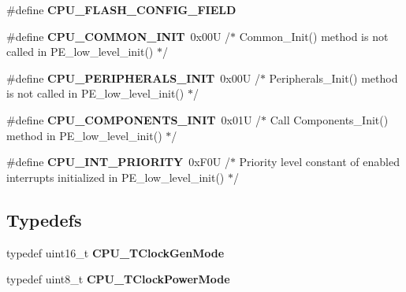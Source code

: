 \begin{DoxyCompactItemize}
\item 
\#define {\bfseries C\+P\+U\+\_\+\+F\+L\+A\+S\+H\+\_\+\+C\+O\+N\+F\+I\+G\+\_\+\+F\+I\+E\+LD}\hypertarget{group___c_p_u___config__module_ga32af3a7804d5da1b44adca4851b7b1b5}{}\label{group___c_p_u___config__module_ga32af3a7804d5da1b44adca4851b7b1b5}

\item 
\#define {\bfseries C\+P\+U\+\_\+\+C\+O\+M\+M\+O\+N\+\_\+\+I\+N\+IT}~0x00\+U     /$\ast$ Common\+\_\+\+Init() method is not called in P\+E\+\_\+low\+\_\+level\+\_\+init() $\ast$/\hypertarget{group___c_p_u___config__module_gaff4ff10573834f8245f591e31e16f05c}{}\label{group___c_p_u___config__module_gaff4ff10573834f8245f591e31e16f05c}

\item 
\#define {\bfseries C\+P\+U\+\_\+\+P\+E\+R\+I\+P\+H\+E\+R\+A\+L\+S\+\_\+\+I\+N\+IT}~0x00\+U     /$\ast$ Peripherals\+\_\+\+Init() method is not called in P\+E\+\_\+low\+\_\+level\+\_\+init() $\ast$/\hypertarget{group___c_p_u___config__module_ga3b8c325b04ca50d0f8e0652527dc0d13}{}\label{group___c_p_u___config__module_ga3b8c325b04ca50d0f8e0652527dc0d13}

\item 
\#define {\bfseries C\+P\+U\+\_\+\+C\+O\+M\+P\+O\+N\+E\+N\+T\+S\+\_\+\+I\+N\+IT}~0x01\+U     /$\ast$ Call Components\+\_\+\+Init() method in P\+E\+\_\+low\+\_\+level\+\_\+init() $\ast$/\hypertarget{group___c_p_u___config__module_ga9ac1ad29d88b073b9ab6fd9bd04c2491}{}\label{group___c_p_u___config__module_ga9ac1ad29d88b073b9ab6fd9bd04c2491}

\item 
\#define {\bfseries C\+P\+U\+\_\+\+I\+N\+T\+\_\+\+P\+R\+I\+O\+R\+I\+TY}~0x\+F0\+U     /$\ast$ Priority level constant of enabled interrupts initialized in P\+E\+\_\+low\+\_\+level\+\_\+init() $\ast$/\hypertarget{group___c_p_u___config__module_ga54aad002152c75f04ffaaf2fe1b43189}{}\label{group___c_p_u___config__module_ga54aad002152c75f04ffaaf2fe1b43189}

\end{DoxyCompactItemize}
\subsection*{Typedefs}
\begin{DoxyCompactItemize}
\item 
typedef uint16\+\_\+t {\bfseries C\+P\+U\+\_\+\+T\+Clock\+Gen\+Mode}\hypertarget{group___c_p_u___config__module_gabae494b1360a0460899ab57917025afe}{}\label{group___c_p_u___config__module_gabae494b1360a0460899ab57917025afe}

\item 
typedef uint8\+\_\+t {\bfseries C\+P\+U\+\_\+\+T\+Clock\+Power\+Mode}\hypertarget{group___c_p_u___config__module_ga7edff48801fa84900fc11f515f240a09}{}\label{group___c_p_u___config__module_ga7edff48801fa84900fc11f515f240a09}

\end{DoxyCompactItemize}
